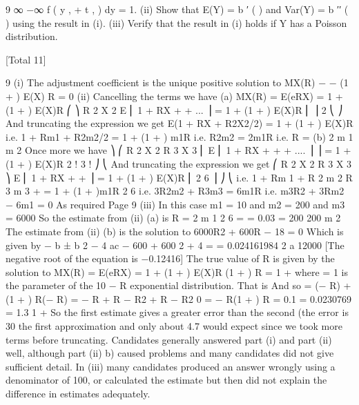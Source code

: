 9
∞
\int  −∞ f ( y , \theta  + \phi  t , \phi  ) dy = 1.
(ii) Show that E(Y) = b ′ ( \theta  ) and Var(Y) = \phi  b ′′ ( \theta  ) using the result in (i).
(iii) Verify that the result in (i) holds if Y has a Poisson distribution.


[Total 11]


9
(i)
The adjustment coefficient is the unique positive solution to
\lambda MX(R) − \lambda  − \lambda (1 + \theta ) E(X) R = 0
(ii)
Cancelling the \lambda  terms we have
(a)
MX(R) = E(eRX) = 1 + (1 + \theta ) E(X)R
⎛
⎞
R 2 X 2
E ⎜ 1 + RX +
+ ... ⎟ = 1 + (1 + \theta ) E(X)R
⎜
⎟
2
⎝
⎠
And truncating the expression we get
E(1 + RX + R2X2/2) = 1 + (1 + \theta ) E(X)R
i.e. 1 + Rm1 + R2m2/2 = 1 + (1 + \theta ) m1R
i.e. R2m2 = 2\theta m1R
i.e. R =
(b)
2 \theta  m 1
m 2
Once more we have
⎞
⎛
R 2 X 2 R 3 X 3
⎜
E ⎜ 1 + RX +
+
+ .... ⎟ ⎟ = 1 + (1 + \theta ) E(X)R
2 !
3 !
⎠
⎝
And truncating the expression we get
⎛
R 2 X 2 R 3 X 3 ⎞
E ⎜ 1 + RX +
+
⎟ = 1 + (1 + \theta ) E(X)R
⎜
2
6 ⎟ ⎠
⎝
i.e. 1 + Rm 1 +
R 2 m 2 R 3 m 3
+
= 1 + (1 + \theta )m1R
2
6
i.e. 3R2m2 + R3m3 = 6\theta m1R
i.e. m3R2 + 3Rm2 − 6\theta m1 = 0
As required
Page 9%
(iii)
In this case m1 = 10 and m2 = 200 and m3 = 6000
So the estimate from (ii) (a) is R =
2 \theta  m 1 2  
6
=
= 0.03
=
200
200
m 2
The estimate from (ii) (b) is the solution to 6000R2 + 600R − 18 = 0
Which is given by
− b ± b 2 − 4 ac
− 600 + 600 2 + 4  
=
= 0.024161984
2 a
12000
[The negative root of the equation is −0.12416]
The true value of R is given by the solution to
MX(R) = E(eRX) = 1 + (1 + \theta ) E(X)R
\mu 
(1 + \theta  ) R
= 1 +
where \mu  = 1 is the parameter of the
10
\mu − R
\mu 
exponential distribution.
That is
And so
 = \mu (\mu  − R) + (1 + \theta ) R(\mu  − R)
 =  − \mu R + \mu R − R2 + \mu \theta R − \theta R2
0 = \mu \theta  − R(1 + \theta )
R =
0.1 
\mu \theta 
= 0.0230769
=
1.3
1 + \theta 
So the first estimate gives a greater error than the second (the error is 30%
the first approximation and only about 4.7%
would expect since we took more terms before truncating.
Candidates generally answered part (i) and part (ii) well, although part (ii) b) caused
problems and many candidates did not give sufficient detail. In (iii) many candidates
produced an answer wrongly using a denominator of 100, or calculated the estimate but then
did not explain the difference in estimates adequately.
